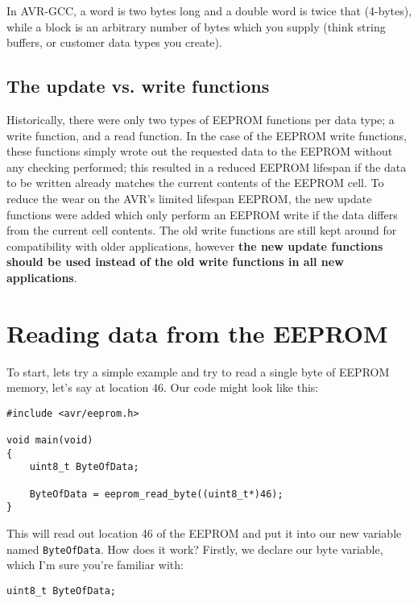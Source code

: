 \documentclass[a4paper,oneside,notitlepage]{book}
\begin{document}
In AVR-GCC, a word is two bytes long and a double word is twice that (4-bytes), while a block is an arbitrary number of bytes which you supply (think string buffers, or customer data types you create).

\section{The update vs. write functions}

Historically, there were only two types of EEPROM functions per data type; a write function, and a read function. In the case of the EEPROM write functions, these functions simply wrote out the requested data to the EEPROM without any checking performed; this resulted in a reduced EEPROM lifespan if the data to be written already matches the current contents of the EEPROM cell. To reduce the wear on the AVR's limited lifespan EEPROM, the new update functions were added which only perform an EEPROM write if the data differs from the current cell contents. The old write functions are still kept around for compatibility with older applications, however \textbf{the new update functions should be used instead of the old write functions in all new applications}.


\chapter{Reading data from the EEPROM}

To start, lets try a simple example and try to read a single byte of EEPROM memory, let's say at location 46. Our code might look like this:

\begin{center}
\begin{lstlisting}
#include <avr/eeprom.h>

void main(void)
{
    uint8_t ByteOfData;

    ByteOfData = eeprom_read_byte((uint8_t*)46);
}
\end{lstlisting}
\end{center}

This will read out location 46 of the EEPROM and put it into our new variable named \lstinline{ByteOfData}. How does it work? Firstly, we declare our byte variable, which I'm sure you're familiar with:

\begin{center}
\begin{lstlisting}
uint8_t ByteOfData;
\end{lstlisting}
\end{center}
\end{document}
